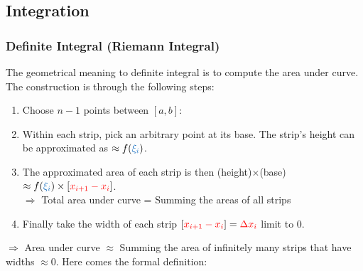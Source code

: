 \documentclass[class=article, crop=false, 12pt]{standalone}
\begin{document}
\subsection{Integration}

\subsubsection{Definite Integral (Riemann Integral)}

The geometrical meaning to definite integral is to compute the area under curve. 
The construction is through the following steps:


\begin{enumerate}
    \item Choose $n-1$ points between $[a,b]$:

    \item Within each strip, pick an arbitrary point  at its base. 
    The strip's height can be approximated as $\approx f(\blue{\xi_i})$.


    \item The approximated area of each strip is then (height)$\times$(base) $\approx f(\blue{\xi_i})\times [\red{x_{i+1}-x_i}]$.\\
        $\Rightarrow$ Total area under curve = Summing the areas of all strips 

    \item Finally take the width of each strip $[{\color{red}{x_{i+1}-x_i}}] = {\color{red}{\Delta x_i}}$ limit to $0$. \\
        
\end{enumerate}

$\Rightarrow$ Area under curve $\approx$ Summing the area of infinitely many strips that have widths $\approx 0$. 
Here comes the formal definition:
\end{document}
